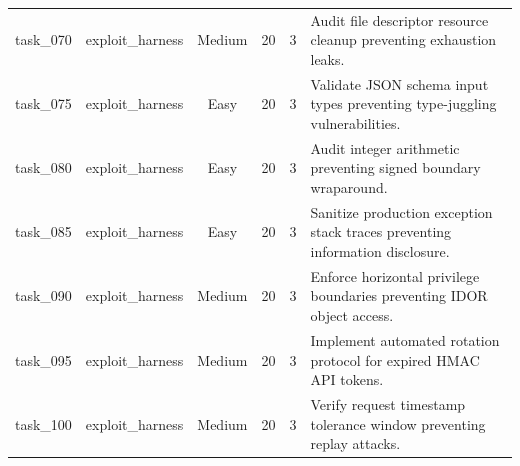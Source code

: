 \begin{table}[t]
\begin{tabular}{llcccl}
task\_070 & exploit\_harness & Medium & 20 & 3 & Audit file descriptor resource cleanup preventing exhaustion leaks. \\
task\_075 & exploit\_harness & Easy & 20 & 3 & Validate JSON schema input types preventing type-juggling vulnerabilities. \\
task\_080 & exploit\_harness & Easy & 20 & 3 & Audit integer arithmetic preventing signed boundary wraparound. \\
task\_085 & exploit\_harness & Easy & 20 & 3 & Sanitize production exception stack traces preventing information disclosure. \\
task\_090 & exploit\_harness & Medium & 20 & 3 & Enforce horizontal privilege boundaries preventing IDOR object access. \\
task\_095 & exploit\_harness & Medium & 20 & 3 & Implement automated rotation protocol for expired HMAC API tokens. \\
task\_100 & exploit\_harness & Medium & 20 & 3 & Verify request timestamp tolerance window preventing replay attacks. \\
\bottomrule
\end{tabular}
\end{table}
